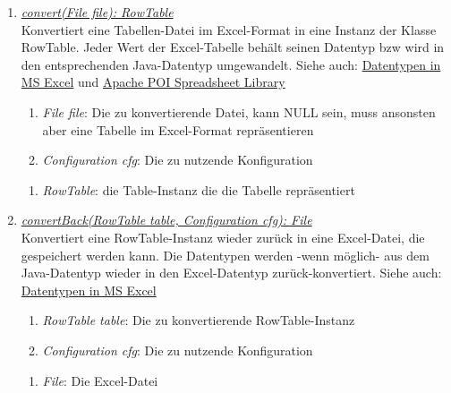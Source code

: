 \begin{enumerate}[+]
	\item \underline{\textit{convert(File file): RowTable}} \\
	Konvertiert eine Tabellen-Datei im Excel-Format in eine Instanz der Klasse RowTable.
	Jeder Wert der Excel-Tabelle behält seinen Datentyp bzw wird in den entsprechenden Java-Datentyp umgewandelt.
	Siehe auch: \href{https://support.office.com/en-us/article/data-types-in-data-models-e2388f62-6122-4e2b-bcad-053e3da9ba90#__toc327893213}{Datentypen in MS Excel} und 
	\href{http://poi.apache.org/spreadsheet/}{Apache POI Spreadsheet Library}	
	\begin{enumerate}[$\bullet$]
		\item \textit{File file}: Die zu konvertierende Datei, kann NULL sein, muss ansonsten aber eine Tabelle im Excel-Format repräsentieren
		\item \textit{Configuration cfg}: Die zu nutzende Konfiguration
	\end{enumerate}
	\vspace{-0.2cm}
	\begin{enumerate}[$\circ$]
		\item \textit{RowTable}: die Table-Instanz die die Tabelle repräsentiert
	\end{enumerate}
	
	\item \underline{\textit{convertBack(RowTable table, Configuration cfg): File}} \\
	Konvertiert eine RowTable-Instanz wieder zurück in eine Excel-Datei, die gespeichert werden kann.
	Die Datentypen werden -wenn möglich- aus dem Java-Datentyp wieder in den Excel-Datentyp zurück-konvertiert.
	Siehe auch: \href{https://support.office.com/en-us/article/data-types-in-data-models-e2388f62-6122-4e2b-bcad-053e3da9ba90#__toc327893213}{Datentypen in MS Excel}
	\begin{enumerate}[$\bullet$]
		\item \textit{RowTable table}: Die zu konvertierende RowTable-Instanz
		\item \textit{Configuration cfg}: Die zu nutzende Konfiguration
	\end{enumerate}
	\vspace{-0.2cm}
	\begin{enumerate}[$\circ$]
		\item \textit{File}: Die Excel-Datei
	\end{enumerate}
\end{enumerate}
